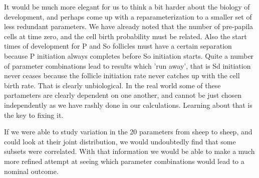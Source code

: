 \documentclass[titlepage]{article}  %
\begin{document}
It would be much more elegant for us to think a bit harder about the biology of development, and perhaps come up with a reparameterization to a smaller set of less redundant parameters. We have already noted that the number of pre-papila cells at time zero, and the cell birth probability must be related. Also the start times of development for P and So follicles must have a certain separation because P initiation always completes before So initiation starts. Quite a number of parameter combinations lead to results which 'run away', that is Sd initiation never ceases because the follicle initiation rate never catches up with the cell birth rate. That is clearly unbiological.  In the real world some of these partameters are clearly dependent on one another, and cannot be just chosen independently as we have rashly done in our calculations. Learning about that is the key to fixing it. 

If we were able to study variation in the 20 parameters from sheep to sheep, and could look at their joint distribution, we would undoubtedly find that some subsets were correlated. With that information we would be able to make a much more refined attempt at seeing which parameter combinations would lead to a nominal outcome.
\end{document}
